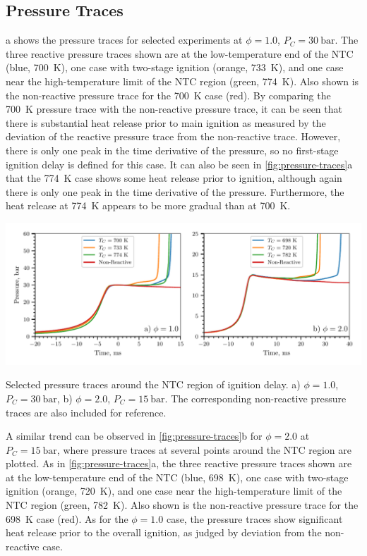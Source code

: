 \documentclass[letterpaper, review, sort&compress]{elsarticle}
\begin{document}
\subsection{Pressure Traces}\label{sec:pressure-traces}

a shows the pressure traces for selected experiments at \(\phi=1.0\),
\(P_C =\SI[number-unit-product={\ }]{30}{\bar}\). The three reactive pressure traces shown are at
the low-temperature end of the NTC (blue, \SI{700}{\K}), one case with two-stage ignition (orange,
\SI{733}{\K}), and one case near the high-temperature limit of the NTC region (green, \SI{774}{\K}).
Also shown is the non-reactive pressure trace for the \SI{700}{\K} case (red). By comparing the
\SI{700}{\K} pressure trace with the non-reactive pressure trace, it can be seen that there is
substantial heat release prior to main ignition as measured by the deviation of the reactive
pressure trace from the non-reactive trace. However, there is only one peak in the time derivative
of the pressure, so no first-stage ignition delay is defined for this case. It can also be seen in
\cref{fig:pressure-traces}a that the \SI{774}{\K} case shows some heat release prior to ignition,
although again there is only one peak in the time derivative of the pressure. Furthermore, the heat
release at \SI{774}{\K} appears to be more gradual than at \SI{700}{\K}.

\begin{center}
    \captionsetup{type=figure}
    \includegraphics[width=\textwidth]{figures/pressure-traces.pdf}
    \caption{Selected pressure traces around the NTC region of ignition delay.  a) \(\phi=1.0\),
    \(P_C=\SI{30}{\bar}\), b) \(\phi=2.0\), \(P_C=\SI{15}{\bar}\). The corresponding non-reactive
    pressure traces are also included for reference.}
    \label{fig:pressure-traces}
\end{center}

A similar trend can be observed in \cref{fig:pressure-traces}b for \(\phi=2.0\) at
\(P_C=\SI{15}{\bar}\), where pressure traces at several points around the NTC region are plotted. As
in \cref{fig:pressure-traces}a, the three reactive pressure traces shown are at the low-temperature
end of the NTC (blue, \SI{698}{\K}), one case with two-stage ignition (orange, \SI{720}{\K}), and
one case near the high-temperature limit of the NTC region (green, \SI{782}{\K}). Also shown is the
non-reactive pressure trace for the \SI{698}{\K} case (red). As for the \(\phi=1.0\) case, the
pressure traces show significant heat release prior to the overall ignition, as judged by deviation
from the non-reactive case.
\end{document}
